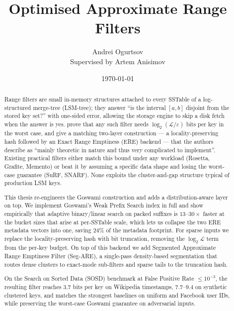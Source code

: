\documentclass[12pt,a4paper,oneside]{report}
\title{Optimised Approximate Range Filters}
\author{Andrei Ogurtsov \\ \small Supervised by Artem Anisimov}
\date{\today}
\begin{document}
    \maketitle

    \begin{abstract}
        Range filters are small in-memory structures attached to every SSTable of a
        log-structured merge-tree (LSM-tree); they answer ``is the interval $[a, b]$
        disjoint from the stored key set?'' with one-sided error, allowing the storage
        engine to skip a disk fetch when the answer is yes.
        \citet{goswami2015approximate} prove that any such filter needs
        $\log_2(\mathcal{L}/\varepsilon)$ bits per key in the worst case, and give a
        matching two-layer construction --- a locality-preserving hash followed by an
        Exact Range Emptiness (ERE) backend --- that the authors describe as ``mainly
        theoretic in nature and thus very complicated to implement''.
        Existing practical filters either match this bound under any workload
        (Rosetta, Grafite, Memento) or beat it by assuming a specific data shape and
        losing the worst-case guarantee (SuRF, SNARF).
        None exploits the cluster-and-gap structure typical of production LSM keys.

        This thesis re-engineers the Goswami construction and adds a distribution-aware
        layer on top.
        We implement Goswami's Weak Prefix Search index in full and show empirically
        that adaptive binary/linear search on packed suffixes is $13$--$30\times$
        faster at the bucket sizes that arise at per-SSTable scale, which lets us
        collapse the two ERE metadata vectors into one, saving $24\%$ of the
        metadata footprint.
        For sparse inputs we replace the locality-preserving hash with bit truncation,
        removing the $\log_2 \mathcal{L}$ term from the per-key budget.
        On top of this backend we add Segmented Approximate Range Emptiness Filter
        (Seg-ARE), a single-pass density-based segmentation that routes dense
        clusters to exact-mode sub-filters and sparse tails to the truncation hash.

        On the Search on Sorted Data (SOSD) benchmark at False Positive Rate $\leq 10^{-3}$,
        the resulting filter reaches $3.7$ bits per key on Wikipedia timestamps, $7.7$--$9.4$ on synthetic
        clustered keys, and matches the strongest baselines on uniform and Facebook
        user IDs, while preserving the worst-case Goswami guarantee on adversarial
        inputs.
    \end{abstract}
\end{document}
